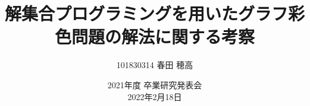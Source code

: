 \documentclass[dvipdfmx,11pt]{beamer}
\title{解集合プログラミングを用いたグラフ彩色問題の解法に関する考察}
\author{101830314 春田 穂高}
\institute{番原研究室}
\date{2021年度 卒業研究発表会\\2022年2月18日}
\begin{document}
\frame{\maketitle}

\end{document}
